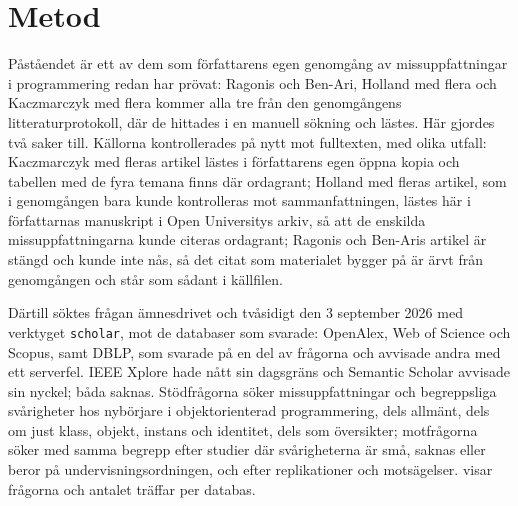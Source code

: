 \section{Metod}
\label{sec:miss-metod-klasser}

Påståendet är ett av dem som författarens egen genomgång av
missuppfattningar i programmering \autocite{SooriBosk2026} redan har
prövat: Ragonis och
Ben-Ari, Holland med flera och Kaczmarczyk med flera kommer alla tre
från den genomgångens litteraturprotokoll, där de hittades i en
manuell sökning och lästes.  Här gjordes två saker till.  Källorna
kontrollerades på nytt mot fulltexten, med olika utfall:
Kaczmarczyk med fleras artikel lästes i författarens egen öppna kopia
och tabellen med de fyra temana finns där ordagrant; Holland med fleras
artikel, som i genomgången bara kunde kontrolleras mot sammanfattningen,
lästes här i författarnas manuskript i Open Universitys arkiv, så att
de enskilda missuppfattningarna kunde citeras ordagrant; Ragonis och
Ben-Aris artikel är stängd och kunde inte nås, så det citat som
materialet bygger på är ärvt från genomgången och står som sådant i
källfilen.

Därtill söktes frågan ämnesdrivet och tvåsidigt den 3 september 2026
med verktyget \texttt{scholar}, mot de databaser som svarade: OpenAlex,
Web of Science och Scopus, samt DBLP, som svarade på en del av frågorna
och avvisade andra med ett serverfel.  IEEE Xplore hade nått sin
dagsgräns och Semantic Scholar avvisade sin nyckel; båda saknas.
Stödfrågorna söker missuppfattningar och begreppsliga svårigheter hos
nybörjare i objektorienterad programmering, dels allmänt, dels om just
klass, objekt, instans och identitet, dels som översikter; motfrågorna
söker med samma begrepp efter studier där svårigheterna är små, saknas
eller beror på undervisningsordningen, och efter replikationer och
motsägelser.   visar frågorna och antalet
träffar per databas.


